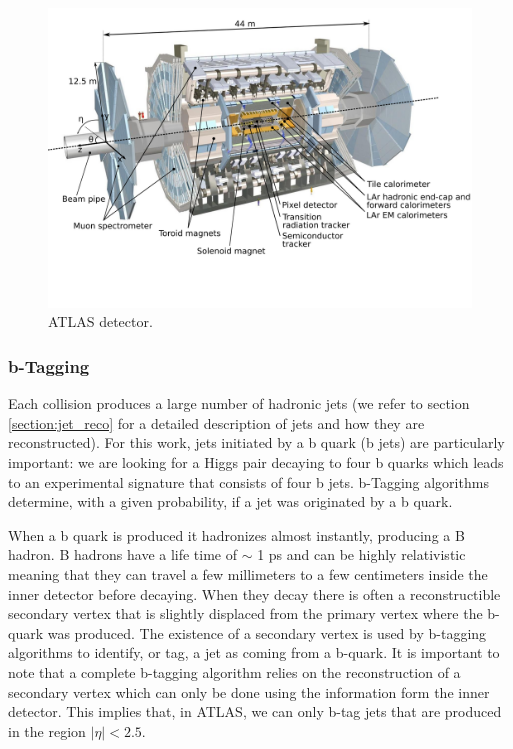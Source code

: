 \begin{figure}
	\centering
	\includegraphics[trim={0cm 3.5cm 0cm 0},clip,width=\textwidth]{./Figures/ATLASsvg3.png}
	\caption{ATLAS detector.}
	\label{fig:ATLAS_detector}
\end{figure} 

\subsubsection{b-Tagging}

Each collision produces a large number of hadronic jets (we refer to section \ref{section:jet_reco} for a detailed description of jets and how they are reconstructed). For this work, jets initiated by a b quark (b jets) are particularly important: we are looking for a Higgs pair decaying to four b quarks which leads to an experimental signature that consists of four b jets. b-Tagging algorithms determine, with a given probability, if a jet was originated by a b quark. 

When a b quark is produced it hadronizes almost instantly, producing a B hadron. B hadrons have a life time of $\sim$ 1 ps and can be highly relativistic meaning that they can travel a few millimeters to a few centimeters inside the inner detector before decaying. When they decay there is often a reconstructible secondary vertex that is slightly displaced from the primary vertex where the b-quark was produced. The existence of a secondary vertex is used by b-tagging algorithms to identify, or tag, a jet as coming from a b-quark. It is important to note that a complete b-tagging algorithm relies on the reconstruction of a secondary vertex which can only be done using the information form the inner detector. This implies that, in ATLAS, we can only b-tag jets that are produced in the region $|\eta|<2.5$.

